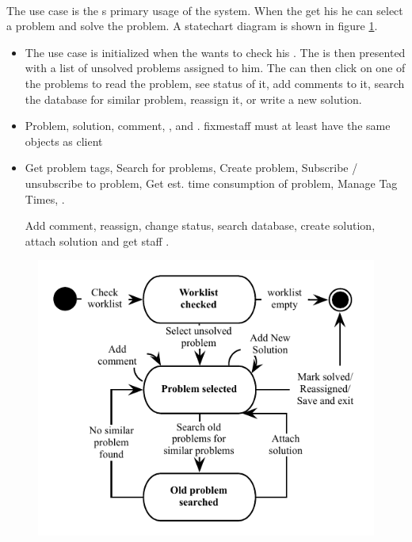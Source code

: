 \paragraph{\ucsolproblem[c]} The use case \ucsolproblem{} is the \astaff{}s primary usage of the system. When the \astaff[] get his \todolist[] he can select a problem and solve the problem. A statechart diagram is shown in figure \ref{fig:solve_problem_use_case}.

\begin{itemize}
\item {} The use case is initialized when the \astaff[] wants to check his \todolist[]. The \astaff[] is then presented with a list of unsolved problems assigned to him. The \astaff[] can then click on one of the problems to read the problem, see status of it, add comments to it, search the database for similar problem, reassign it, or write a new solution. 

\item {} Problem, solution, comment, \client[], and \staff[].
fixme{staff must at least have the same objects as client}

\item {}Get problem tags, Search for problems, Create problem, Subscribe / unsubscribe to problem, Get est. time consumption of problem, Manage Tag Times,  . 


 Add comment, reassign, change status, search database, create solution, attach solution and get staff \todolist{}.
\end{itemize}

\begin{figure}[htbp]
\begin{center}
 \includegraphics[scale=0.8]{input/application_domain_analysis/solve_problem_use_case}
\label{fig:solve_problem_use_case}
\end{center}
\end{figure}

